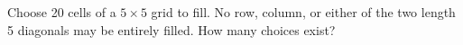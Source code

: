 Choose 20 cells of a $ 5\times5 $ grid to fill. No row, column, or either of the two length 5 diagonals may be entirely filled. How many choices exist?
